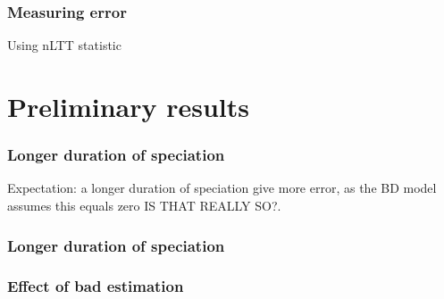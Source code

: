 \documentclass{beamer}
\begin{document}
\begin{frame}
  \frametitle{Measuring error}

  Using nLTT statistic\footnotemark


\end{frame}

\section[Preliminary results]{Preliminary results}

\begin{frame}
  \frametitle{Longer duration of speciation}

  Expectation: a longer duration of speciation give more error, as the BD model assumes this equals zero IS THAT REALLY SO?.

\end{frame}

\begin{frame}
  \frametitle{Longer duration of speciation}

  \begin{figure}[]
    
  \end{figure}

\end{frame}

\begin{frame}
  \frametitle{Effect of bad estimation}

  \begin{figure}[]
    \subfloat[]{
      
    }
    \subfloat[]{
      
    }
  \end{figure}


\end{frame}
\end{document}
